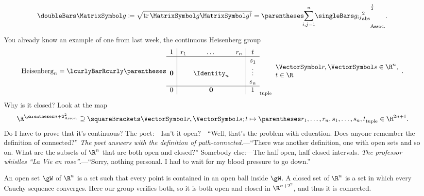 \documentclass[10pt, a4paper, twoside]{lecturenotes}
\newcommand{\Rn}{{\R^n}}
\begin{document}
\begin{lecture}[date=2013-04-23]
\begin{definition}
\[\FrobeniusNorm\matg \DefineAs \sqrt{\Trace\matg\adj\matg} = \pa{\sum{i,j=1}[n]\abs{g_{ij}}^2}^{\frac{1}{2}}\text.
\]
\end{definition}
You already know an example of one from last week, the continuous Heisenberg group\[
\HeisenbergGroup[n]=\setst{\tuple{
\begin{array}{c|ccc|c}
1&r_1&\dotsc&r_n&t\\
\hline
&&&&s_1\\
\nullvec&&\Identity_n&&\vdots\\
&&&&s_n\\
\hline
0&&\nullvec&&1
\end{array}
}}{\begin{array}{l}\vr,\vs\in\Rn,\\ t\in\R\end{array}}\text.
\]
Why is it closed? Look at the map\[
\FunctionBody{\R^{\pa{n+2}^2}\Superset\Helt \vr \vs t} {\tuple{r_1,\dotsc,r_n,s_1,\dotsc,s_n,t}\in\R^{2n+1}}\text.
\]
Do I have to prove that it's continuous? 
The poet:---Isn't it open?---``Well, that's the problem with education. Does anyone remember the definition of connected?'' \emph{The poet answers with the definition of path-connected}.---``There was another definition, one with open sets and so on. What are the subsets of $\Rn$ that are both open and closed?'' Somebody else:---The half open, half closed intervals. \emph{The professor whistles ``La Vie en rose''}.---``Sorry, nothing personal. I had to wait for my blood pressure to go down.''

An open set $\gW$ of $\Rn$ is a set such that every point is contained in an open ball inside $\gW$. A closed set of  $\Rn$ is a set in which every Cauchy sequence converges. Here our group verifies both, so it is both open and closed in $\R^{{n+2}^2}$, and thus it is connected.


\end{lecture}
\end{document}

